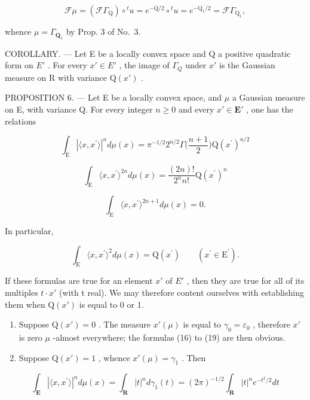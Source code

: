 \[
\mathcal {F} \mu = \left(\mathcal {F} \Gamma_ {\mathrm{Q}}\right) \circ {} ^ {t} u = e ^ {- \mathrm{Q} / 2} \circ {} ^ {t} u = e ^ {- \mathrm{Q} _ {1} / 2} = \mathcal {F} \Gamma_ {\mathrm{Q} _ {1}},
\]

whence \(\mu = \Gamma_{\mathbf{Q}_1}\) by Prop. 3 of No.~3.

COROLLARY. --- Let E be a locally convex space and Q a positive quadratic form on \(E'\) . For every \(x' \in E'\) , the image of \(\Gamma_{Q}\) under \(x'\) is the Gaussian measure on R with variance \(\mathrm{Q}(x')\) .

PROPOSITION 6. --- Let E be a locally convex space, and \(\mu\) a Gaussian measure on E, with variance Q. For every integer \(n \geqslant 0\) and every \(x' \in \mathbf{E}'\) , one has the relations

\[
\int_ {\mathrm{E}} | \langle x, x ^ {\prime} \rangle | ^ {n} d \mu (x) = \pi^ {- 1 / 2} 2 ^ {n / 2} \Gamma \Big (\frac {n + 1}{2} \Big) \mathrm{Q} (x ^ {\prime}) ^ {n / 2}\tag{16}
\]

\[
\int_ {\mathrm{E}} \langle x, x ^ {\prime} \rangle^ {2 n} d \mu (x) = \frac {(2 n) !}{2 ^ {n} n !} \mathrm{Q} (x ^ {\prime}) ^ {n}\tag{17}
\]

\[
\int_ {\mathrm{E}} \langle x, x ^ {\prime} \rangle^ {2 n + 1} d \mu (x) = 0.\tag{18}
\]

In particular,

\[
\int_ {\mathrm{E}} \langle x, x ^ {\prime} \rangle^ {2} d \mu (x) = \mathrm{Q} (x ^ {\prime}) \qquad (x ^ {\prime} \in \mathrm{E} ^ {\prime}).\tag{19}
\]

If these formulas are true for an element \(x'\) of \(E'\) , then they are true for all of its multiples \(t \cdot x'\) (with t real). We may therefore content ourselves with establishing them when \(\mathrm{Q}(x')\) is equal to 0 or 1.

\begin{enumerate}
\def\labelenumi{\alph{enumi})}
\item
  Suppose \(\mathrm{Q}(x') = 0\) . The measure \(x'(\mu)\) is equal to \(\gamma_{0} = \varepsilon_{0}\) , therefore \(x'\) is zero \(\mu\) -almost everywhere; the formulas (16) to (19) are then obvious.
\item
  Suppose \(\mathrm{Q}(x') = 1\) , whence \(x'(\mu) = \gamma_{1}\) . Then
\end{enumerate}

\[
\int_ {\mathbf {E}} | \langle x, x ^ {\prime} \rangle | ^ {n} d \mu (x) = \int_ {\mathbf {R}} | t | ^ {n} d \gamma_ {1} (t) = (2 \pi) ^ {- 1 / 2} \int_ {\mathbf {R}} | t | ^ {n} e ^ {- t ^ {2} / 2} d t
\]

